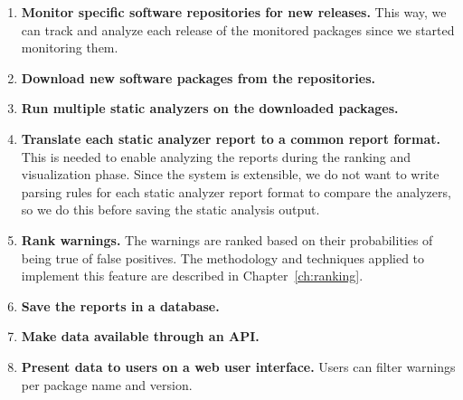 \begin{enumerate}
\item \textbf{Monitor specific software repositories for new releases.} This way, we can track and analyze each release of the monitored packages since we started monitoring them.

\item \textbf{Download new software packages from the repositories.}

\item \textbf{Run multiple static analyzers on the downloaded packages.}

\item \textbf{Translate each static analyzer report to a common report format.} This is needed to enable analyzing the reports during the ranking and visualization phase. Since the system is extensible, we do not want to write parsing rules for each static analyzer report format to compare the analyzers, so we do this before saving the static analysis output.

\item \textbf{Rank warnings.} The warnings are ranked based on their probabilities of being true of false positives. The methodology and techniques applied to implement this feature are described in Chapter~\ref{ch:ranking}.

\item \textbf{Save the reports in a database.}

\item \textbf{Make data available through an API.}

\item \textbf{Present data to users on a web user interface.} Users can filter warnings per package name and version.
\end{enumerate}

